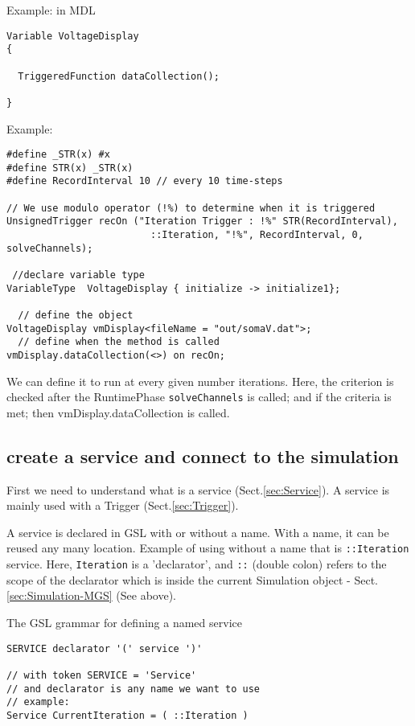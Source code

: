 Example: in MDL 
\begin{verbatim}
Variable VoltageDisplay
{

  TriggeredFunction dataCollection();
  
}
\end{verbatim}

Example:
\begin{verbatim}
#define _STR(x) #x
#define STR(x) _STR(x)
#define RecordInterval 10 // every 10 time-steps

// We use modulo operator (!%) to determine when it is triggered 
UnsignedTrigger recOn ("Iteration Trigger : !%" STR(RecordInterval),
                         ::Iteration, "!%", RecordInterval, 0, solveChannels);

 //declare variable type
VariableType  VoltageDisplay { initialize -> initialize1};

  // define the object
VoltageDisplay vmDisplay<fileName = "out/somaV.dat">;
  // define when the method is called
vmDisplay.dataCollection(<>) on recOn;
\end{verbatim}
We can define it to run at every given number iterations. 
Here, the criterion is checked after the RuntimePhase \verb!solveChannels! is
called; and if the criteria is met; then vmDisplay.dataCollection is called.


\subsection{create a service and connect to the simulation}
\label{sec:service-how-to-declare-in-GSL}

First we need to understand what is a service (Sect.\ref{sec:Service}).
A service is mainly used with a Trigger (Sect.\ref{sec:Trigger}).

A service is declared in GSL with or without a name. With a name, it can be
reused any many location. Example of using without a name that is
\verb!::Iteration! service. Here, \verb!Iteration! is a 'declarator', and
\verb!::! (double colon) refers to the scope of the declarator which is inside
the current Simulation object - Sect.\ref{sec:Simulation-MGS} (See above).

The GSL grammar for defining a named service

\begin{verbatim}
SERVICE declarator '(' service ')'

// with token SERVICE = 'Service'
// and declarator is any name we want to use
// example:
Service CurrentIteration = ( ::Iteration )
\end{verbatim}

